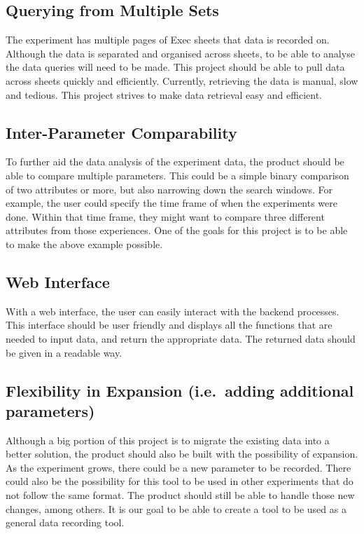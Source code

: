 \documentclass{article}
\begin{document}
\subsection*{Querying from Multiple Sets}
The experiment has multiple pages of Exec sheets that data is recorded on.
Although the data is separated and organised across sheets, to be able to
analyse the data queries will need to be made. This project should be able to
pull data across sheets quickly and efficiently. Currently, retrieving the data
is manual, slow and tedious. This project strives to make data retrieval easy
and efficient.  

\subsection*{Inter-Parameter Comparability}
To further aid the data analysis of the experiment data, the product should be
able to compare multiple parameters. This could be a simple binary comparison of
two attributes or more, but also narrowing down the search windows. For example,
the user could specify the time frame of when the experiments were done. Within
that time frame, they might want to compare three different attributes from
those experiences. One of the goals for this project is to be able to make the
above example possible.

\subsection*{Web Interface}
With a web interface, the user can easily interact with the backend processes.
This interface should be user friendly and displays all the functions that are
needed to input data, and return the appropriate data. The returned data should
be given in a readable way.

\subsection*{Flexibility in Expansion (i.e.\ adding additional parameters)}
Although a big portion of this project is to migrate the existing data into a
better solution, the product should also be built with the possibility of
expansion. As the experiment grows, there could be a new parameter to be
recorded. There could also be the possibility for this tool to be used in other
experiments that do not follow the same format. The product should still be able
to handle those new changes, among others. It is our goal to be able to create a
tool to be used as a general data recording tool.
\end{document}
